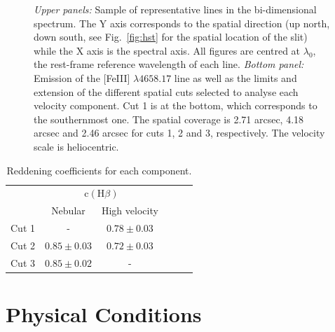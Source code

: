 \documentclass[fleqn,usenatbib]{mnras}
\begin{document}
\begin{figure}
\caption{\textit{Upper panels:} Sample of representative lines in the bi-dimensional spectrum. The Y axis corresponds to the spatial direction (up north, down south, see Fig.~\ref{fig:hst} for the spatial location of the slit) while the X axis is the spectral axis. All figures are centred at $\lambda_0$, the rest-frame reference wavelength of each line. \textit{Bottom panel:} Emission of the [Fe\thinspace III] $\lambda 4658.17$ line as well as the limits and extension of the different spatial cuts selected to analyse each velocity component. Cut 1 is at the bottom, which corresponds to the southernmost one. The spatial coverage is 2.71 arcsec, 4.18 arcsec and 2.46 arcsec for cuts 1, 2 and 3, respectively. The velocity scale is heliocentric.}
\label{fig:cuts}
\end{figure}




\begin{table}
\caption{Reddening coefficients for each component.}
\label{tab:c_extin}
\begin{tabular}{lccccc}
\hline
 & \multicolumn{2}{c}{$\text{c}(\text{H}\beta)$} \\
  & Nebular & High velocity\\
\hline
Cut 1 & - & $0.78 \pm  0.03$  \\
Cut 2 & $0.85 \pm 0.03$ &$0.72 \pm 0.03$\\
Cut 3 & $0.85 \pm 0.02$&-\\
\hline
\end{tabular}
\end{table}





\section{Physical Conditions}
\label{sec:physical_cond}
\end{document}
